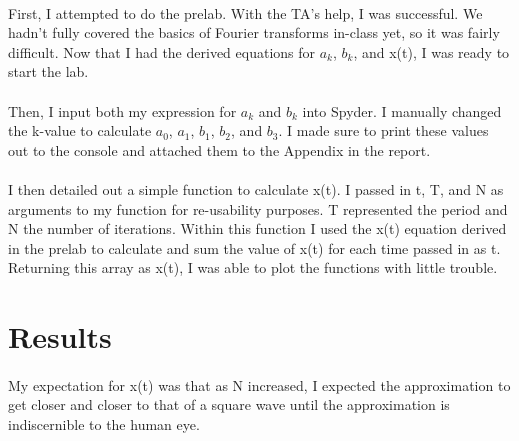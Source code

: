 \documentclass[12pt]{report}
\begin{document}
    \paragraph{} First, I attempted to do the prelab. With the TA's help, I was successful. We hadn't fully covered the basics of Fourier transforms in-class yet, so it was fairly difficult. Now that I had the derived equations for $a_k$, $b_k$, and x(t), I was ready to start the lab. 
    
    \paragraph{} Then, I input both my expression for $a_k$ and $b_k$ into Spyder. I manually changed the k-value to calculate $a_0$, $a_1$, $b_1$, $b_2$, and $b_3$. I made sure to print these values out to the console and attached them to the Appendix in the report. 
    
    \paragraph{} I then detailed out a simple function to calculate x(t). I passed in t, T, and N as arguments to my function for re-usability purposes. T represented the period and N the number of iterations. Within this function I used the x(t) equation derived in the prelab to calculate and sum the value of x(t) for each time passed in as t. Returning this array as x(t), I was able to plot the functions with little trouble.
    
\section{Results}

    
    \paragraph{} My expectation for x(t) was that as N increased, I expected the approximation to get closer and closer to that of a square wave until the approximation is indiscernible to the human eye.
    
\end{document}

